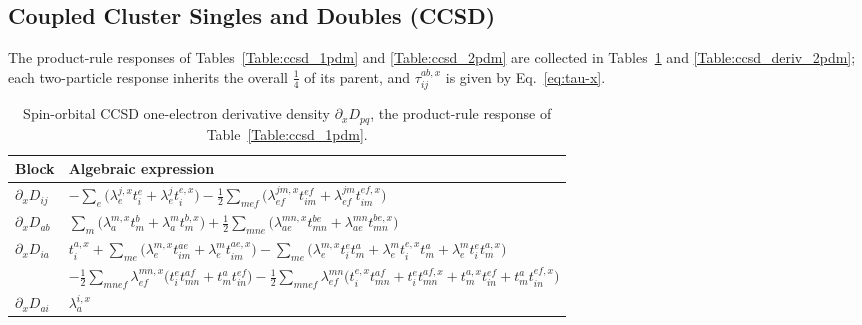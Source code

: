 \documentclass[12pt]{article}
\begin{document}
\subsection{Coupled Cluster Singles and Doubles (CCSD)}
\label{sec:ccsd_deriv_pdms}

The product-rule responses of Tables~\ref{Table:ccsd_1pdm} and
\ref{Table:ccsd_2pdm} are collected in Tables~\ref{Table:ccsd_deriv_1pdm} and
\ref{Table:ccsd_deriv_2pdm}; each two-particle response inherits the overall
$\frac14$ of its parent, and $\tau^{ab,x}_{ij}$ is given by Eq.~\eqref{eq:tau-x}.

\begin{table}[H]
\caption{Spin-orbital CCSD one-electron derivative density $\partial_x D_{pq}$,
the product-rule response of Table~\ref{Table:ccsd_1pdm}.}
\label{Table:ccsd_deriv_1pdm}
\renewcommand{\arraystretch}{1.6}
\begin{center}
\begin{tabular}{ll}
\hline\hline
Block & Algebraic expression \\
\hline
$\partial_x D_{ij}$ & $\displaystyle -\sum_e\big(\lambda^{j,x}_e t^e_i + \lambda^j_e t^{e,x}_i\big) - \frac12\sum_{mef}\big(\lambda^{jm,x}_{ef} t^{ef}_{im} + \lambda^{jm}_{ef} t^{ef,x}_{im}\big)$ \\
$\partial_x D_{ab}$ & $\displaystyle \sum_m\big(\lambda^{m,x}_a t^b_m + \lambda^m_a t^{b,x}_m\big) + \frac12\sum_{mne}\big(\lambda^{mn,x}_{ae} t^{be}_{mn} + \lambda^{mn}_{ae} t^{be,x}_{mn}\big)$ \\
$\partial_x D_{ia}$ & $\displaystyle t^{a,x}_i + \sum_{me}\big(\lambda^{m,x}_e t^{ae}_{im} + \lambda^m_e t^{ae,x}_{im}\big) - \sum_{me}\big(\lambda^{m,x}_e t^e_i t^a_m + \lambda^m_e t^{e,x}_i t^a_m + \lambda^m_e t^e_i t^{a,x}_m\big)$ \\
 & $\displaystyle - \frac12\sum_{mnef}\lambda^{mn,x}_{ef}\big(t^e_i t^{af}_{mn} + t^a_m t^{ef}_{in}\big) - \frac12\sum_{mnef}\lambda^{mn}_{ef}\big(t^{e,x}_i t^{af}_{mn} + t^e_i t^{af,x}_{mn} + t^{a,x}_m t^{ef}_{in} + t^a_m t^{ef,x}_{in}\big)$ \\
$\partial_x D_{ai}$ & $\displaystyle \lambda^{i,x}_a$ \\
\hline\hline
\end{tabular}
\end{center}
\end{table}
\end{document}
